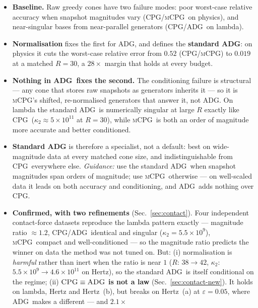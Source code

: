 \documentclass[11pt]{article}
\newcommand{\CPG}{\textsc{CPG}}
\newcommand{\ADG}{\textsc{ADG}}
\newcommand{\mCPG}{\textsc{mCPG}}
\begin{document}
\begin{itemize}
  \item \textbf{Baseline.} Raw greedy cones have two failure modes: poor
        worst-case relative accuracy when snapshot magnitudes vary (\CPG/\mCPG\ on
        physics), and near-singular bases from near-parallel generators
        (\CPG/\ADG\ on lambda).
  \item \textbf{Normalisation} fixes the first for \ADG, and defines the
        \textbf{standard \ADG}: on physics it cuts the worst-case relative error
        from $0.52$ (\CPG/\mCPG) to $0.019$ at a matched $R=30$, a $28\times$
        margin that holds at every budget.
  \item \textbf{Nothing in \ADG\ fixes the second.} The conditioning failure is
        structural --- any cone that stores raw snapshots as generators inherits
        it --- so it is \mCPG's shifted, re-normalised generators that answer it,
        not \ADG. On lambda the standard \ADG\ is numerically singular at large
        $R$ exactly like \CPG\ ($\kappa_2\approx5\times10^{11}$ at $R=30$), while
        \mCPG\ is both an order of magnitude more accurate and better conditioned.
  \item \textbf{Standard \ADG} is therefore a specialist, not a default: best on
        wide-magnitude data at every matched cone size, and indistinguishable from
        \CPG\ everywhere else. \emph{Guidance:} use the standard \ADG\ when
        snapshot magnitudes span orders of magnitude; use \mCPG\ otherwise --- on
        well-scaled data it leads on both accuracy and conditioning, and \ADG\ adds
        nothing over \CPG.
  \item \textbf{Confirmed, with two refinements} (Sec.~\ref{sec:contact}). Four
        independent contact-force datasets reproduce the lambda pattern exactly
        --- magnitude ratio $\approx1.2$, \CPG/\ADG\ identical and singular
        ($\kappa_2=5.5\times10^{9}$), \mCPG\ compact and well-conditioned --- so
        the magnitude ratio predicts the winner on data the method was not tuned
        on. But: (i) normalisation is \emph{harmful} rather than inert when the
        ratio is near $1$ ($R$: $38\to42$, $\kappa_2$: $5.5\times10^{9}\to
        4.6\times10^{11}$ on Hertz), so the standard \ADG\ is itself conditional
        on the regime;
        (ii) \textbf{$\CPG\equiv\ADG$ is not a law} (Sec.~\ref{sec:contact-new}).
        It holds on lambda, Hertz and Hertz~(b), but breaks on Hertz~(a) at
        $\varepsilon=0.05$, where \ADG\ makes a different --- and $2.1\times$

\end{itemize}
\end{document}
